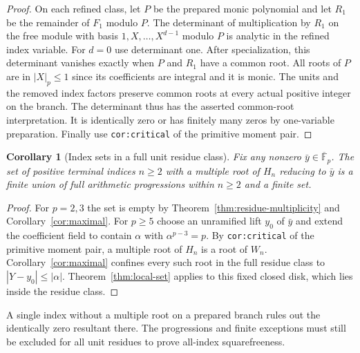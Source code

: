 \documentclass[11pt]{article}
\newtheorem{corollary}[theorem]{Corollary}
\begin{document}
\begin{proof}
On each refined class, let $P$ be the prepared monic polynomial
and let $R_1$ be the remainder of $F_1$ modulo $P$.
The determinant of multiplication by $R_1$ on the free module
with basis $1,X,\ldots,X^{d-1}$ modulo $P$ is analytic in the
refined index variable. For $d=0$ use determinant one.
After specialization, this determinant vanishes exactly when
$P$ and $R_1$ have a common root. All roots of $P$ are
in $|X|_p\le1$ since its coefficients are integral and it is monic.
The units and the removed index factors preserve common roots
at every actual positive integer on the branch. The determinant
thus has the asserted common-root interpretation. It is identically
zero or has finitely many zeros by one-variable preparation.
Finally use \texttt{cor:critical} of the primitive moment pair.
\end{proof}


\begin{corollary}[Index sets in a full unit residue class]\label{cor:full-residue}
Fix any nonzero $\bar y\in\overline{\mathbb F}_p$.
The set of positive terminal indices $n\ge2$ with a multiple
root of $H_n$ reducing to $\bar y$ is a finite union of full
arithmetic progressions within $n\ge2$ and a finite set.
\end{corollary}
\begin{proof}
For $p=2,3$ the set is empty by Theorem~\ref{thm:residue-multiplicity}
and Corollary~\ref{cor:maximal}.
For $p\ge5$ choose an unramified lift $y_0$ of $\bar y$ and extend
the coefficient field to contain $\alpha$ with $\alpha^{p-3}=p$.
By \texttt{cor:critical} of the primitive moment pair, a multiple
root of $H_n$ is a root of $W_n$.
Corollary~\ref{cor:maximal} confines every such root in the
full residue class to $|Y-y_0|\le|\alpha|$.
Theorem~\ref{thm:local-set} applies to this fixed closed disk,
which lies inside the residue class.
\end{proof}

A single index without a multiple root on a prepared branch rules
out the identically zero resultant there. The progressions and finite exceptions must still be excluded
for all unit residues to prove all-index squarefreeness.
\end{document}
